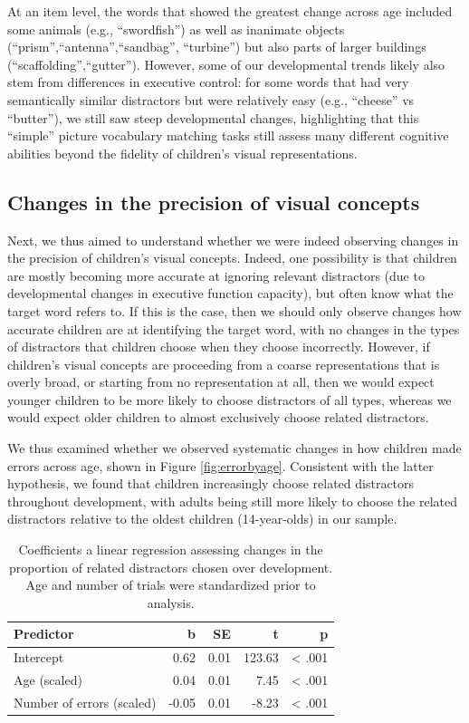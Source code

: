 \documentclass[
  man,mask]{apa6}
\begin{document}
At an item level, the words that showed the greatest change across age included some animals (e.g., ``swordfish'') as well as inanimate objects (``prism'',``antenna'',``sandbag'', ``turbine'') but also parts of larger buildings (``scaffolding'',``gutter''). However, some of our developmental trends likely also stem from differences in executive control: for some words that had very semantically similar distractors but were relatively easy (e.g., ``cheese'' vs ``butter''), we still saw steep developmental changes, highlighting that this ``simple'' picture vocabulary matching tasks still assess many different cognitive abilities beyond the fidelity of children's visual representations.

\subsection{Changes in the precision of visual concepts}\label{changes-in-the-precision-of-visual-concepts}

Next, we thus aimed to understand whether we were indeed observing changes in the precision of children's visual concepts. Indeed, one possibility is that children are mostly becoming more accurate at ignoring relevant distractors (due to developmental changes in executive function capacity), but often know what the target word refers to. If this is the case, then we should only observe changes how accurate children are at identifying the target word, with no changes in the types of distractors that children choose when they choose incorrectly. However, if children's visual concepts are proceeding from a coarse representations that is overly broad, or starting from no representation at all, then we would expect younger children to be more likely to choose distractors of all types, whereas we would expect older children to almost exclusively choose related distractors.

We thus examined whether we observed systematic changes in how children made errors across age, shown in Figure \ref{fig:errorbyage}. Consistent with the latter hypothesis, we found that children increasingly choose related distractors throughout development, with adults being still more likely to choose the related distractors relative to the oldest children (14-year-olds) in our sample.

\begin{table}
\centering
\caption{\label{tab:unnamed-chunk-21}Coefficients a linear regression  assessing changes in the proportion of related distractors chosen over development. Age and number of trials were standardized prior to analysis.}
\centering
\begin{tabular}[t]{lrrrr}
\toprule
Predictor & b & SE & t & p\\
\midrule
Intercept & 0.62 & 0.01 & 123.63 & < .001\\
Age (scaled) & 0.04 & 0.01 & 7.45 & < .001\\
Number of errors (scaled) & -0.05 & 0.01 & -8.23 & < .001\\
\bottomrule
\end{tabular}
\end{table}
\end{document}
